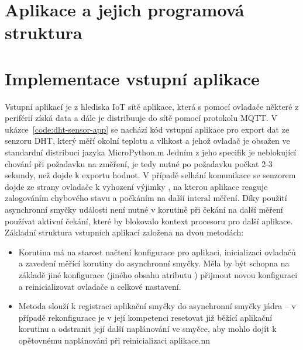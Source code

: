 
\section{Aplikace a jejich programová struktura}\label{sec:aplikace-a-jejich-programova-struktura}



\section{Implementace vstupní aplikace}\label{sec:implementace-vstupni-aplikace}
Vstupní aplikací je z hlediska IoT sítě aplikace, která s pomocí ovladače některé z periférií získá data a dále je
distribuuje do sítě pomocí protokolu MQTT.
V ukázce~\ref{code:dht-sensor-app} se nachází kód vstupní aplikace pro export dat ze senzoru DHT, který měří okolní
teplotu a vlhkost a jehož ovladač je obsažen ve standardní distribuci jazyka MicroPython.m
Jedním z jeho specifik je neblokující chování při požadavku na změření, je tedy nutné po požadavku počkat
2-3 sekundy, než dojde k exportu hodnot. 
V případě selhání komunikace se senzorem dojde ze strany ovladače k vyhození výjimky , na kterou aplikace
reaguje zalogováním chybového stavu a počkáním na další interal měření.
Díky použití asynchronní smyčky události není nutné v korutině  při čekání na další měření
používat aktivní čekání, které by blokovalo kontext procesoru pro další aplikace.
Základní struktura vstupních aplikací založena na dvou metodách:
\begin{itemize}
    \item Korutina  má na starost načtení konfigurace pro aplikaci, inicializaci ovladačů a zavedení
    měřící korutiny do asynchronní smyčky. Měla by být schopna na základě jiné konfigurace (jiného obsahu atributu
    ) přijmout novou konfiguraci a reinicializovat ovladače a celkové nastavení.
    \item Metoda  slouží k registraci aplikační smyčky do asynchronní smyčky jádra -- v případě
    rekonfigurace je v její kompetenci resetovat již běžící aplikační korutinu a odstranit její další naplánování ve
    smyčce, aby mohlo dojít k opětovnému naplánování při reinicializaci aplikace.nn
\end{itemize}

